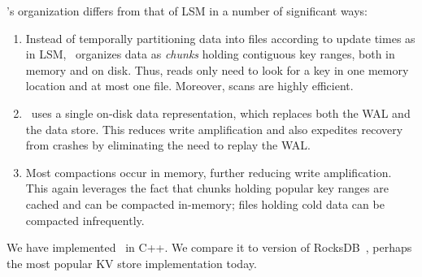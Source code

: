 \sys's organization differs from that of LSM  in a number of significant ways: 
\begin{enumerate}
\item Instead of temporally partitioning data into files according to update times as in LSM, 
\sys\ organizes data as  \emph{chunks} holding contiguous key ranges, both in memory and on disk. 
Thus, reads
only need to look for a key in one memory location and at most one file. Moreover, scans are highly efficient.


\item \sys\ uses a single on-disk data representation, which replaces both the WAL and the data store.  
This reduces write amplification %
and also expedites recovery from crashes by eliminating the need to replay the WAL. 
\item Most compactions occur in memory, further reducing write amplification. This again leverages the fact that chunks holding
popular key ranges are cached and can be compacted in-memory; files holding cold data can be compacted infrequently. 
 \end{enumerate}


We have implemented \sys\ in C++. We compare it to version  of RocksDB~\cite{rocks}, perhaps the most popular KV store implementation today.  




